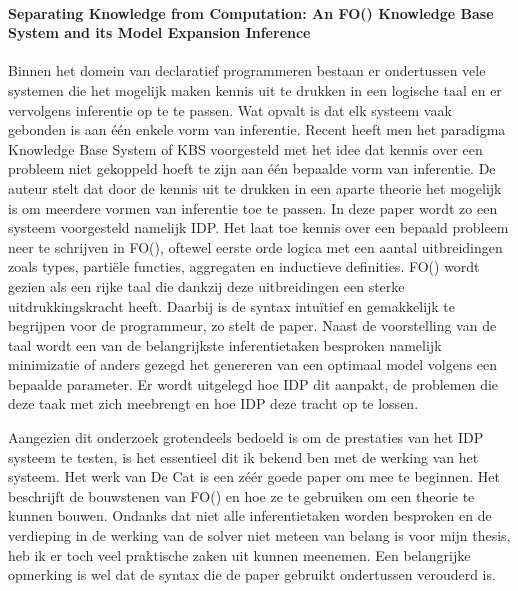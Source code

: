 \paragraph{Separating Knowledge from Computation: An FO(\textperiodcentered) Knowledge Base System and its Model Expansion Inference \cite{de2014separating}}
Binnen het domein van declaratief programmeren bestaan er ondertussen vele systemen die het mogelijk maken kennis uit te drukken in een logische taal en er vervolgens inferentie op te te passen. Wat opvalt is dat elk systeem vaak gebonden is aan \'{e}\'{e}n enkele vorm van inferentie. Recent heeft men het paradigma Knowledge Base System of KBS voorgesteld met het idee dat kennis over een probleem niet gekoppeld hoeft te zijn aan \'{e}\'{e}n bepaalde vorm van inferentie. De auteur stelt dat door de kennis uit te drukken in een aparte theorie het mogelijk is om meerdere vormen van inferentie toe te passen. In deze paper wordt zo een systeem voorgesteld namelijk IDP. Het laat toe kennis over een bepaald probleem neer te schrijven in FO(\textperiodcentered), oftewel eerste orde logica met een aantal uitbreidingen zoals types, parti\"{e}le functies, aggregaten en inductieve definities. FO(\textperiodcentered) wordt gezien als een rijke taal die dankzij deze uitbreidingen een sterke uitdrukkingskracht heeft. Daarbij is de syntax intu\"{i}tief en gemakkelijk te begrijpen voor de programmeur, zo stelt de paper. Naast de voorstelling van de taal wordt een van de belangrijkste inferentietaken besproken namelijk minimizatie of anders gezegd het genereren van een optimaal model volgens een bepaalde parameter. Er wordt uitgelegd hoe IDP dit aanpakt, de problemen die deze taak met zich meebrengt en hoe IDP deze tracht op te lossen. 

Aangezien dit onderzoek grotendeels bedoeld is om de prestaties van het IDP systeem te testen, is het essentieel dit ik bekend ben met de werking van het systeem. Het werk van De Cat is een z\'{e}\'{e}r goede paper om mee te beginnen. Het beschrijft de bouwstenen van FO(\textperiodcentered) en hoe ze te gebruiken om een theorie te kunnen bouwen. Ondanks dat niet alle inferentietaken worden besproken en de verdieping in de werking van de solver niet meteen van belang is voor mijn thesis, heb ik er toch veel praktische zaken uit kunnen meenemen. Een belangrijke opmerking is wel dat de syntax die de paper gebruikt ondertussen verouderd is. 


